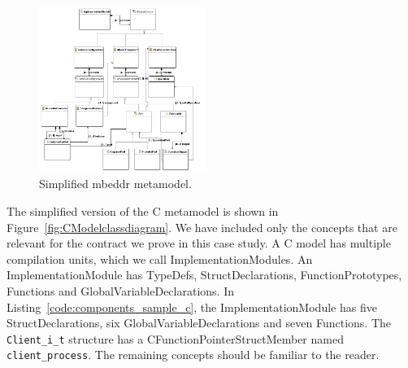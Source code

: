 \begin{figure}
\begin{center}
  \includegraphics[width=0.48\textwidth]{figures/Moduleclassdiagram}
  \caption{Simplified mbeddr metamodel. }
  \label{fig:Moduleclassdiagram}
\end{center}
\end{figure}

The simplified version of the C metamodel is shown in Figure~\ref{fig:CModelclassdiagram}. 
We have included only the concepts that are relevant for the contract we prove in this case study.
A C model has multiple compilation units, which we call ImplementationModules. An ImplementationModule has TypeDefs, StructDeclarations, FunctionPrototypes, Functions and GlobalVariableDeclarations.
In Listing~\ref{code:components_sample_c}, the ImplementationModule has five StructDeclarations, six GlobalVariableDeclarations and seven Functions.
The \verb=Client_i_t= structure has a CFunctionPointerStructMember named \verb=client_process=. The remaining concepts should be familiar to the reader.

